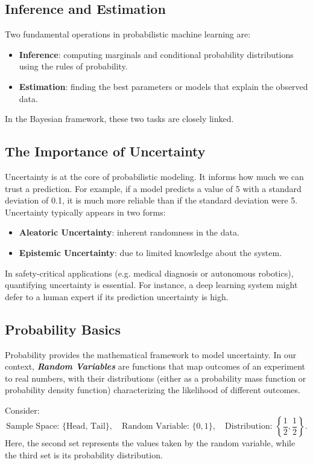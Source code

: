 \subsection{Inference and Estimation}
Two fundamental operations in probabilistic machine learning are:
\begin{itemize}
    \item \textbf{Inference}: computing marginals and conditional probability distributions using the rules of probability.
    \item \textbf{Estimation}: finding the best parameters or models that explain the observed data.
\end{itemize}
In the Bayesian framework, these two tasks are closely linked.

\subsection{The Importance of Uncertainty}
Uncertainty is at the core of probabilistic modeling. It informs how much we can trust a prediction. For example, if a model predicts a value of 5 with a standard deviation of 0.1, it is much more reliable than if the standard deviation were 5. Uncertainty typically appears in two forms:
\begin{itemize}
    \item \textbf{Aleatoric Uncertainty}: inherent randomness in the data.
    \item \textbf{Epistemic Uncertainty}: due to limited knowledge about the system.
\end{itemize}
In safety-critical applications (e.g. medical diagnosis or autonomous robotics), quantifying uncertainty is essential. For instance, a deep learning system might defer to a human expert if its prediction uncertainty is high.

\subsection{Probability Basics}
Probability provides the mathematical framework to model uncertainty. In our context, \textbf{\textit{Random Variables}} are functions that map outcomes of an experiment to real numbers, with their distributions (either as a probability mass function or probability density function) characterizing the likelihood of different outcomes.

\begin{exampleblock}
Consider:
$$
\text{Sample Space: } \{ \text{Head, Tail} \}, \quad \text{Random Variable: } \{0,1\}, \quad \text{Distribution: } \left\{\frac{1}{2},\frac{1}{2}\right\}.
$$
Here, the second set represents the values taken by the random variable, while the third set is its probability distribution.
\end{exampleblock}


